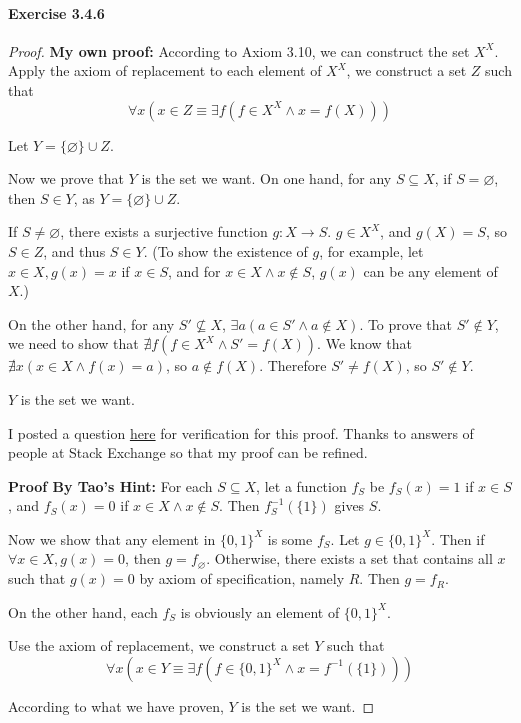 \paragraph{Exercise 3.4.6} \label{exercise3.4.6}
\begin{proof}
\textbf{My own proof:} According to Axiom 3.10, we can construct the set $X^X$. Apply the axiom 
of replacement to each element of $X^X$, we construct a set $Z$ such that
\[
\forall x(x \in Z \equiv \exists f(f \in X^X \wedge x = f(X)))
\]

Let $Y = \{\varnothing\} \cup Z$.

Now we prove that $Y$ is the set we want. On one hand, for any $S \subseteq X$, 
if $S = \varnothing$, then $S \in Y$, as $Y = \{\varnothing\} \cup Z$.

If $S \neq \varnothing$, there exists a surjective function $g: X \rightarrow S$. $g\in X^X$, and 
$g(X) = S$, so $S \in Z$, and thus $S \in Y$. (To show the existence of $g$, for example, let $x \in X, 
g(x) = x$ if $x \in S$, and for $x \in X \wedge x \notin S$, $g(x)$ can be any element of $X$.)


On the other hand, for any $S' \nsubseteq X$, $\exists a(a \in S' \wedge a \notin X)$. To prove that 
$S' \notin Y$, we need to show that $\nexists f(f \in X^X \wedge S' = f(X))$. We know that 
$\nexists x(x \in X \wedge f(x) = a)$, so $a \notin f(X)$. Therefore $S' \neq f(X)$, so $S' \notin Y$.

$Y$ is the set we want.

I posted a question \href{https://math.stackexchange.com/questions/3803487/is-this-proof-to-the-existence-of-a-set-that-contains-all-subsets-of-another-set}{here} for verification for this proof. 
Thanks to answers of people at Stack Exchange so that my proof can be refined.

\textbf{Proof By Tao's Hint:}
For each $S \subseteq X$, let a function $f_S$ be $f_S(x) = 1$ if $x \in S$, and $f_S(x)=0$ if 
$x \in X \wedge x \notin S$. Then $f^{-1}_S(\{1\})$ gives $S$. 

Now we show that any element in 
$\{0,1\}^X$ is some $f_S$. Let $g \in \{0,1\}^X$. Then if $\forall x \in X, g(x) = 0$, then 
$g = f_{\varnothing}$. Otherwise, there exists a set that contains all $x$ such that $g(x) = 0$ by 
axiom of specification, namely $R$. Then $g = f_R$.

On the other hand, each $f_S$ is obviously an element of $\{0,1\}^X$.

Use the axiom of replacement, we construct a set $Y$ such that
\[
\forall x (x \in Y \equiv \exists f(f \in \{0,1\}^X \wedge x = f^{-1}(\{1\})))
\]

According to what we have proven, $Y$ is the set we want.
\end{proof}

